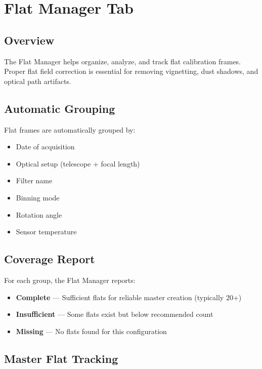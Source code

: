 \documentclass[11pt,a4paper]{article}
\begin{document}
\section{Flat Manager Tab}
\label{sec:flat}

\subsection{Overview}

The Flat Manager helps organize, analyze, and track flat calibration frames. Proper flat field correction is essential for removing vignetting, dust shadows, and optical path artifacts.

\subsection{Automatic Grouping}

Flat frames are automatically grouped by:
\begin{itemize}
    \item Date of acquisition
    \item Optical setup (telescope + focal length)
    \item Filter name
    \item Binning mode
    \item Rotation angle
    \item Sensor temperature
\end{itemize}

\subsection{Coverage Report}

For each group, the Flat Manager reports:
\begin{itemize}
    \item \textcolor{successgreen}{\textbf{Complete}} --- Sufficient flats for reliable master creation (typically 20+)
    \item \textcolor{warningorange}{\textbf{Insufficient}} --- Some flats exist but below recommended count
    \item \textcolor{errorcoral}{\textbf{Missing}} --- No flats found for this configuration
\end{itemize}

\subsection{Master Flat Tracking}
\end{document}
